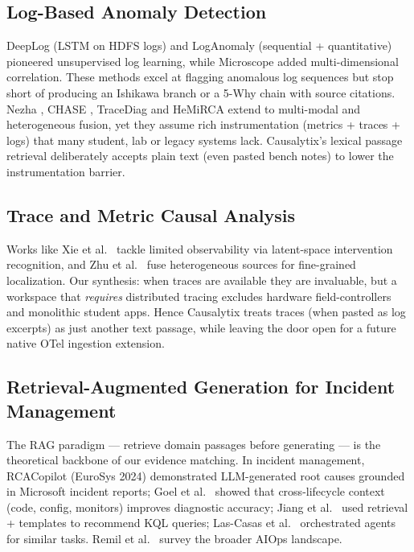 \documentclass[12pt,a4paper,oneside]{report}
\begin{document}
\subsection{Log-Based Anomaly Detection}
DeepLog \cite{du2017deeplog} (LSTM on HDFS logs) and LogAnomaly \cite{li2021loganomaly} (sequential + quantitative) pioneered unsupervised log learning, while Microscope \cite{chen2020microscope} added multi-dimensional correlation. These methods excel at flagging anomalous log sequences but stop short of producing an Ishikawa branch or a 5-Why chain with source citations. Nezha \cite{jin2023nezha}, CHASE \cite{sanchez2023chase}, TraceDiag \cite{ding2023tracediag} and HeMiRCA \cite{zhu2024hemirca} extend to multi-modal and heterogeneous fusion, yet they assume rich instrumentation (metrics + traces + logs) that many student, lab or legacy systems lack. Causalytix's lexical passage retrieval deliberately accepts plain text (even pasted bench notes) to lower the instrumentation barrier.

\subsection{Trace and Metric Causal Analysis}
Works like Xie et al.\ \cite{xie2024microservice} tackle limited observability via latent-space intervention recognition, and Zhu et al.\ \cite{zhu2024hemirca} fuse heterogeneous sources for fine-grained localization. Our synthesis: when traces are available they are invaluable, but a workspace that \textit{requires} distributed tracing excludes hardware field-controllers and monolithic student apps. Hence Causalytix treats traces (when pasted as log excerpts) as just another text passage, while leaving the door open for a future native OTel ingestion extension.

\subsection{Retrieval-Augmented Generation for Incident Management}
The RAG paradigm \cite{lewis2020rag,gao2023retrieval,zhao2024retrieval} --- retrieve domain passages before generating --- is the theoretical backbone of our evidence matching. In incident management, RCACopilot \cite{chen2024rcacopilot} (EuroSys 2024) demonstrated LLM-generated root causes grounded in Microsoft incident reports; Goel et al.\ \cite{goel2024xlifecycle} showed that cross-lifecycle context (code, config, monitors) improves diagnostic accuracy; Jiang et al.\ \cite{jiang2024xpert} used retrieval + templates to recommend KQL queries; Las-Casas et al.\ \cite{lascasas2024llexus} orchestrated agents for similar tasks. Remil et al.\ \cite{remil2024aiops} survey the broader AIOps landscape.
\end{document}
